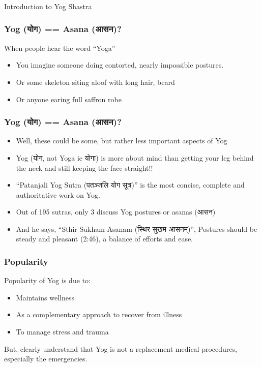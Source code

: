 \begin{frame}[fragile]\frametitle{}
\begin{center}
{\Large Introduction to Yog Shastra}
\end{center}
\end{frame}

\begin{frame}[fragile]\frametitle{Yog (योग) == Asana (आसन)?}
When people hear the word ``Yoga''

	\begin{itemize}
	\item You imagine someone doing contorted, nearly impossible postures.
	\item Or some skeleton siting aloof with long hair, beard
	\item Or anyone earing full saffron robe
	\end{itemize}

\end{frame}

\begin{frame}[fragile]\frametitle{Yog (योग) == Asana (आसन)?}

	\begin{itemize}
	\item Well, these could be some, but rather less important aspects of Yog
	\item Yog (योग, not Yoga ie योगा) is more about mind than getting your leg behind the neck and still keeping the face straight!!
	\item ``Patanjali Yog Sutra (पतञ्जलि योग सूत्र)'' is the most concise, complete and authoritative work on Yog.
	\item Out of 195 sutras, only 3 discuss Yog postures or asanas (आसन)
	\item And he says, ``Sthir Sukham Asanam (स्थिर सुखम आसनम्)'', Postures should be steady and pleasant (2:46), a balance of efforts and ease.
	\end{itemize}

\end{frame}

\begin{frame}[fragile]\frametitle{Popularity}

Popularity of Yog is due to:
	\begin{itemize}
	\item Maintains wellness
	\item As a complementary approach to recover from illness
	\item To manage stress and trauma
	\end{itemize}

But, clearly understand that Yog is not a replacement medical procedures, especially the emergencies.

\end{frame}

